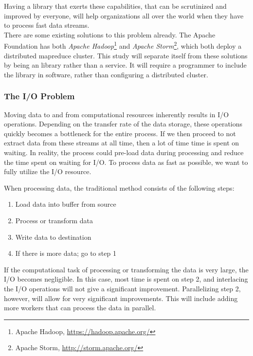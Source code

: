 \documentclass[a4paper]{article}
\begin{document}
Having a library that exerts these capabilities, that can be scrutinized and improved by everyone, will help organizations all over the world when they have to process fast data streams.\\

There are some existing solutions to this problem already. The Apache Foundation has both \textit{Apache Hadoop}\footnote{Apache Hadoop, \url{https://hadoop.apache.org/}} and \textit{Apache Storm}\footnote{Apache Storm, \url{http://storm.apache.org/}}, which both deploy a distributed mapreduce cluster\cite{Dean:2008:MSD:1327452.1327492}. This study will separate itself from these solutions by being an library rather than a service. It will require a programmer to include the library in software, rather than configuring a distributed cluster.


\subsubsection{The I/O Problem}
Moving data to and from computational resources inherently results in I/O operations. Depending on the transfer rate of the data storage, these operations quickly becomes a bottleneck for the entire process. If we then proceed to not extract data from these streams at all time, then a lot of time time is spent on waiting. In reality, the process could pre-load data during processing and reduce the time spent on waiting for I/O. To process data as fast as possible, we want to fully utilize the I/O resource. 

When processing data, the traditional method consists of the following steps:

\begin{enumerate}
\item Load data into buffer from source
\item Process or transform data
\item Write data to destination
\item If there is more data; go to step 1
\end{enumerate}

If the computational task of processing or transforming the data is very large, the I/O becomes negligible. In this case, most time is spent on step 2, and interlacing the I/O operations will not give a significant improvement. Parallelizing step 2, however, will allow for very significant improvements. This will include adding more workers that can process the data in parallel.
\end{document}
